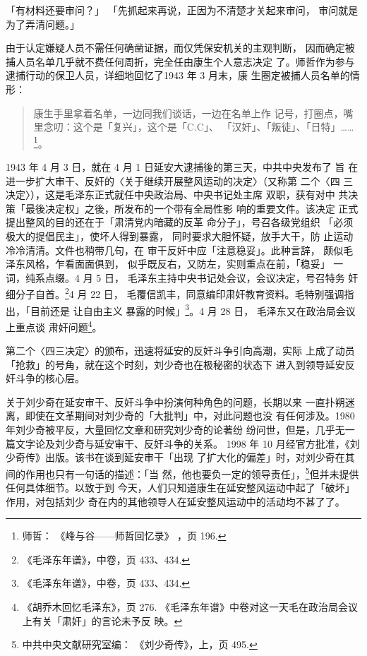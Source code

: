 「有材料还要审问？」
「先抓起来再说，正因为不清楚才关起来审问，
审问就是为了弄清问题。」

由于认定嫌疑人员不需任何确凿证据，而仅凭保安机关的主观判断，
因而确定被捕人员名单几乎就不费任何周折，完全任由康生个人意志决定
了。师哲作为参与逮捕行动的保卫人员，详细地回忆了1943 年 3 月末，康
生圈定被捕人员名单的情形：

\begin{quote}\fzwkai
康生手里拿着名单，一边同我们谈话，一边在名单上作
记号，打圈点，嘴里念叨：这个是「复兴」，这个是「C.C」、
「汉奸」、「叛徒」、「日特」……\footnote{师哲：
《峰与谷——师哲回忆录》
，页 196.}。
\end{quote}

1943 年 4 月 3 日，就在 4 月 1 日延安大逮捕後的第三天，中共中央发布了 旨
在进一步扩大审干、反奸的〈关于继续开展整风运动的决定〉（又称第 二个〈四
三决定〉），这是毛泽东正式就任中央政治局、中央书记处主席 双职，获有对中
共决策「最後决定权」之後，所发布的一个带有全局性影 响的重要文件。该决定
正式提出整风的目的还在于「肃清党内暗藏的反革 命分子」，号召各级党组织
「必须极大的提倡民主」，使坏人得到暴露， 同时要求大胆怀疑，放手大干，防
止运动冷冷清清。文件也稍带几句，在 审干反奸中应「注意稳妥」。此种言辞，
颇似毛泽东风格，乍看面面俱到， 似乎既反右，又防左，实则重点在前，「稳妥」
一词，纯系点缀。4 月 5 日， 毛泽东主持中央书记处会议，会议决定，号召特务
奸细分子自首。\footnote{《毛泽东年谱》，中卷，页 433、434.}4 月 22 日，
毛覆信凯丰，同意编印肃奸教育资料。毛特别强调指出，「目前还是 让自由主义
暴露的时候」\footnote{《毛泽东年谱》，中卷，页 433、434.}。4 月 28 日，
毛泽东又在政治局会议上重点谈 肃奸问题\footnote{《胡乔木回忆毛泽东》，页
276. 《毛泽东年谱》中卷对这一天毛在政治局会议上有关「肃奸」的言论未予反
映。}。

第二个〈四三决定〉的颁布，迅速将延安的反奸斗争引向高潮，实际
上成了动员「抢救」的号角，就在这个时刻，刘少奇也在极秘密的状态下
进入到领导延安反奸斗争的核心层。

关于刘少奇在延安审干、反奸斗争中扮演何种角色的问题，长期以来
一直扑朔迷离，即使在文革期间对刘少奇的「大批判」中，对此问题也没
有任何涉及。1980 年刘少奇被平反，大量回忆文章和研究刘少奇的论著纷
纷问世，但是，几乎无一篇文字论及刘少奇与延安审干、反奸斗争的关系。
1998 年 10 月经官方批准，《刘少奇传》出版。该书在谈到延安审干「出现
了扩大化的偏差」时，对刘少奇在其间的作用也只有一句话的描述：「当
然，他也要负一定的领导责任」，\footnote{中共中央文献研究室编：
《刘少奇传》，上，页 495.}但并未提供任何具体细节。以致于到
今天，人们只知道康生在延安整风运动中起了「破坏」作用，对包括刘少
奇在内的其他领导人在延安整风运动中的活动均不甚了了。

